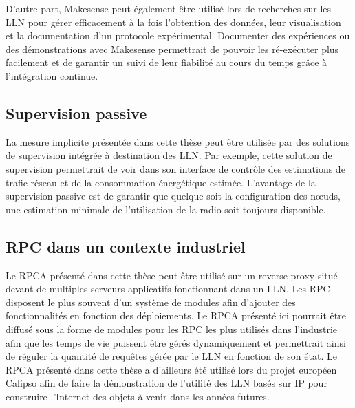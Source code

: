 D'autre part, Makesense peut également être utilisé lors de recherches sur les \ac{LLN} pour gérer efficacement à la fois l'obtention des données, leur visualisation et la documentation d'un protocole expérimental.
Documenter des expériences ou des démonstrations avec Makesense permettrait de pouvoir les ré-exécuter plus facilement et de garantir un suivi de leur fiabilité au cours du temps grâce à l'intégration continue.

\subsection{Supervision passive}

La mesure implicite présentée dans cette thèse peut être utilisée par des solutions de supervision intégrée à destination des \ac{LLN}.
Par exemple, cette solution de supervision permettrait de voir dans son interface de contrôle des estimations de trafic réseau et de la consommation énergétique estimée.
L'avantage de la supervision passive est de garantir que quelque soit la configuration des nœuds, une estimation minimale de l'utilisation de la radio soit toujours disponible.

\subsection{\ac{RPC} dans un contexte industriel}

Le \ac{RPCA} présenté dans cette thèse peut être utilisé sur un reverse-proxy situé devant de multiples serveurs applicatifs fonctionnant dans un \ac{LLN}.
Les \ac{RPC} disposent le plus souvent d'un système de modules afin d'ajouter des fonctionnalités en fonction des déploiements.
Le \ac{RPCA} présenté ici pourrait être diffusé sous la forme de modules pour les \ac{RPC} les plus utilisés dans l'industrie afin que les temps de vie puissent être gérés dynamiquement et permettrait ainsi de réguler la quantité de requêtes gérée par le \ac{LLN} en fonction de son état.
Le \ac{RPCA} présenté dans cette thèse a d'ailleurs été utilisé lors du projet européen Calipso afin de faire la démonstration de l'utilité des \ac{LLN} basés sur IP pour construire l'Internet des objets à venir dans les années futures.

